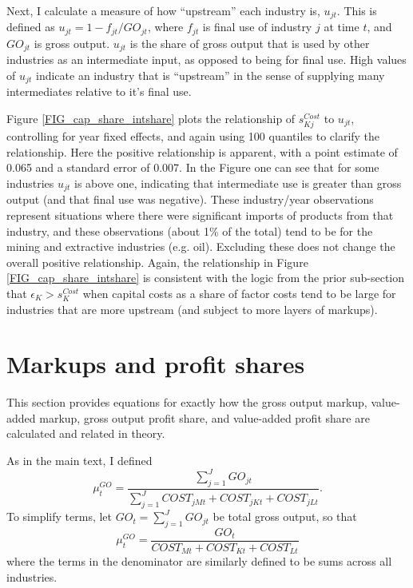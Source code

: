 \documentclass[11pt]{article}
\begin{document}
Next, I calculate a measure of how ``upstream'' each industry is, $u_{jt}$. This is defined as $u_{jt} = 1 - f_{jt}/GO_{jt}$, where $f_{jt}$ is final use of industry $j$ at time $t$, and $GO_{jt}$ is gross output. $u_{jt}$ is the share of gross output that is used by other industries as an intermediate input, as opposed to being for final use. High values of $u_{jt}$ indicate an industry that is ``upstream'' in the sense of supplying many intermediates relative to it's final use.

Figure \ref{FIG_cap_share_intshare} plots the relationship of $s_{Kj}^{Cost}$ to $u_{jt}$, controlling for year fixed effects, and again using 100 quantiles to clarify the relationship. Here the positive relationship is apparent, with a point estimate of 0.065 and a standard error of 0.007. In the Figure one can see that for some industries $u_{jt}$ is above one, indicating that intermediate use is greater than gross output (and that final use was negative). These industry/year observations represent situations where there were significant imports of products from that industry, and these observations (about 1\% of the total) tend to be for the mining and extractive industries (e.g. oil). Excluding these does not change the overall positive relationship. Again, the relationship in Figure \ref{FIG_cap_share_intshare} is consistent with the logic from the prior sub-section that $\epsilon_K > s_K^{Cost}$ when capital costs as a share of factor costs tend to be large for industries that are more upstream (and subject to more layers of markups). 

\section{Markups and profit shares}
This section provides equations for exactly how the gross output markup, value-added markup, gross output profit share, and value-added profit share are calculated and related in theory.

As in the main text, I defined
\begin{equation}
    \mu^{GO}_{t} = \frac{\sum_{j=1}^{J} GO_{jt}}{\sum_{j=1}^J COST_{jMt} + COST_{jKt} + COST_{jLt}}.
\end{equation}
To simplify terms, let $GO_t = \sum_{j=1}^{J} GO_{jt}$ be total gross output, so that
\begin{equation}
	\mu^{GO}_t = \frac{GO_t}{COST_{Mt} + COST_{Kt} + COST_{Lt}}
\end{equation}
where the terms in the denominator are similarly defined to be sums across all industries. 
\end{document}

